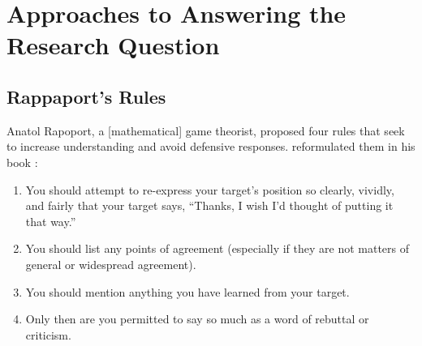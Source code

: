 \section{Approaches to Answering the Research Question}%
\label{sec:appr-answ-rese-quest}\indent%

\subsection{Rappaport's Rules}%
\label{sec:rappaports-rules}\indent%

Anatol Rapoport, a [mathematical] game theorist, proposed four rules that seek to increase understanding and avoid defensive responses.  reformulated them in his book  \parencite{Dennett2013}:
\begin{enumerate}
  \item You should attempt to re-express your target’s position so clearly, vividly, and fairly that your target says, “Thanks, I wish I’d thought of putting it that way.”
  \item You should list any points of agreement (especially if they are not matters of general or widespread agreement).
  \item You should mention anything you have learned from your target.
  \item Only then are you permitted to say so much as a word of rebuttal or criticism.
\end{enumerate}
\medskip

